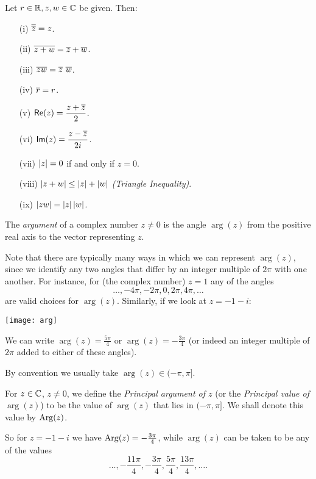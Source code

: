 \begin{proposition}
Let $r \in \mathbb{R}, z, w \in \mathbb{C}$ be given.
Then:
\begin{enumerate}
\item[(i)] $\overline{\overline{z}} = z$.
\item[(ii)] $\overline{z+w} = \overline{z} + \overline{w}$.
\item[(iii)] $\overline{zw} = \overline{z}\ \overline{w}$.
\item[(iv)] $\overline{r} = r$.
\item[(v)] $\textsf{Re} (z) = \displaystyle\frac{z + \overline{z}}{2}$.
\item[(vi)] $\textsf{Im} (z) = \displaystyle\frac{z - \overline{z}}{2i}$.
\item[(vii)] $\left| z \right| = 0$ if and only if $z = 0$.
\item[(viii)] $\left| z + w \right| \leq \left| z \right| + \left| w \right|$ \emph{(Triangle Inequality)}.
\item[(ix)] $\left| zw \right| = \left| z \right| \left| w \right|$.
\end{enumerate}
\end{proposition}


\begin{definition}[Argument]
The \emph{argument} of a complex number $z \neq 0$ is the angle $\arg (z)$ from the positive real axis to the vector representing $z$.  
\end{definition}
Note that there are typically many ways in which we can represent $\arg (z)$, since we identify any two angles that differ by an integer multiple of $2\pi$ with one another.  For instance, for (the complex number) $z=1$ any of the angles
\[
\ldots,-4\pi, -2\pi, 0, 2 \pi , 4\pi,\ldots
\]
are valid choices for $\arg (z)$.   Similarly, if we look at $z=-1-i$:
\begin{center}
\texttt{[image: arg]}
\end{center}
We can write $\arg (z) = \frac{5\pi}{4}$ or $\arg (z)=- \frac{3\pi}{4}$ (or indeed an integer multiple of $2\pi$ added to either of these angles).




By convention we usually take $\arg (z) \in (-\pi , \pi]$.
\begin{definition}
For $z \in \mathbb{C}$, $z \neq 0$, we define the \emph{Principal argument of $z$} (or the \emph{Principal value of $\arg(z)$}) to be the value of $\arg (z)$ that lies in $(-\pi,\pi]$.{\marginpar{There was a typo here originally (missing minus sign in $(\pi,\pi]$)}}  We shall denote this value by $\mathrm{Arg} (z)$.
\end{definition}
So for $z=-1-i$ we have $\mathrm{Arg} (z) = - \frac{3 \pi}{4}$, while $\arg (z)$ can be taken to be any of the values
\[
\ldots, - \frac{11\pi}{4}, - \frac{3\pi}{4}, \frac{5\pi}{4}, \frac{13\pi}{4}, \ldots.
\]


